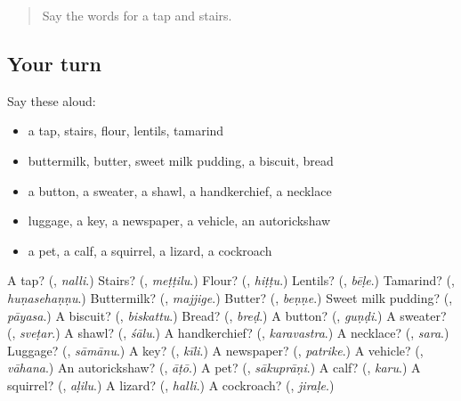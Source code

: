 \label{lesson:KA-R261-second-pass-words-from-chapters-257-261}



\begin{quote}
Say the words for a tap and stairs.
\end{quote}

\subsection*{Your turn}
Say these aloud:

\begin{itemize}
\raggedright
  \item a tap, stairs, flour, lentils, tamarind
  \item buttermilk, butter, sweet milk pudding, a biscuit, bread
  \item a button, a sweater, a shawl, a handkerchief, a necklace
  \item luggage, a key, a newspaper, a vehicle, an autorickshaw
  \item a pet, a calf, a squirrel, a lizard, a cockroach
\end{itemize}

\begin{tcolorbox}[breakable,colback=teal!4,colframe=teal!35!black,title={Before you move on}]
A tap? (\textbf{}, \emph{nalli}.) Stairs? (\textbf{}, \emph{meṭṭilu}.) Flour? (\textbf{}, \emph{hiṭṭu}.) Lentils? (\textbf{}, \emph{bēḷe}.) Tamarind? (\textbf{}, \emph{huṇasehaṇṇu}.) Buttermilk? (\textbf{}, \emph{majjige}.) Butter? (\textbf{}, \emph{beṇṇe}.) Sweet milk pudding? (\textbf{}, \emph{pāyasa}.) A biscuit? (\textbf{}, \emph{biskattu}.) Bread? (\textbf{}, \emph{breḍ}.) A button? (\textbf{}, \emph{guṇḍi}.) A sweater? (\textbf{}, \emph{sveṭar}.) A shawl? (\textbf{}, \emph{śālu}.) A handkerchief? (\textbf{}, \emph{karavastra}.) A necklace? (\textbf{}, \emph{sara}.) Luggage? (\textbf{}, \emph{sāmānu}.) A key? (\textbf{}, \emph{kīli}.) A newspaper? (\textbf{}, \emph{patrike}.) A vehicle? (\textbf{}, \emph{vāhana}.) An autorickshaw? (\textbf{}, \emph{āṭō}.) A pet? (\textbf{}, \emph{sākuprāṇi}.) A calf? (\textbf{}, \emph{karu}.) A squirrel? (\textbf{}, \emph{aḷilu}.) A lizard? (\textbf{}, \emph{halli}.) A cockroach? (\textbf{}, \emph{jiraḷe}.)
\end{tcolorbox}
